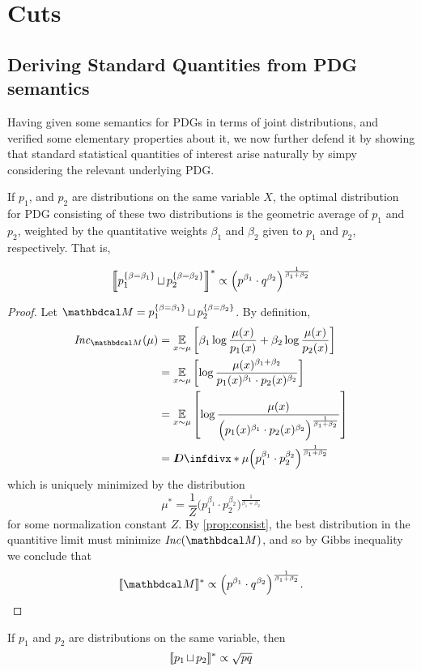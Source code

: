\documentclass[the-pdg-manual.tex]{subfiles}
\begin{document}
\section{Cuts}
\subsection{Deriving Standard Quantities from PDG semantics}
	
	Having given some semantics for PDGs in terms of joint distributions, and verified some elementary properties about it, we now further defend it by showing that standard statistical quantities of interest arise naturally by simpy considering the relevant underlying PDG. 
	
	\begin{prop}
		If $p_1$, and $p_2$ are distributions on the same variable $X$, the optimal distribution for PDG consisting of these two distributions is the geometric average of $p_1$ and $p_2$, weighted by the quantitative weights $\beta_1$ and $\beta_2$ given to $p_1$ and $p_2$, respectively. That is,
		
		\[ \bbr*{p_1 ^{\{\beta = \beta_1 \}} \bundle p_2 ^{\{\beta = \beta_2 \}}}^* \propto \Big(p^{\beta_1} \cdot q^{\beta_2}\Big)^{\frac{1}{\beta_1+\beta_2}} \]
	\end{prop}
	\begin{proof}
		Let $\dg M = p_1 ^{\{\beta = \beta_1 \}} \bundle p_2 ^{\{\beta = \beta_2 \}}$.
		By definition, 
		\begin{align*}
		 	\Inc_{\dg M} (\mu) &= \Ex_{x \sim \mu} \left[ \beta_1 \log \frac{\mu(x)}{p_1(x)} + \beta_2 \log \frac{\mu(x)}{p_2(x)} \right] \\
				&= \Ex_{x \sim \mu} \left[ \log \frac{\mu(x)^{\beta_1 + \beta_2}}{p_1(x)^{\beta_1}\cdot p_2(x)^{\beta_2}} \right] \\
				&= \Ex_{x \sim \mu} \left[ \log \frac{\mu(x)}{\Big( p_1(x)^{\beta_1}\cdot p_2(x)^{\beta_2} \Big)^{\frac{1}{\beta_1+\beta_2}}} \right] \\
				&= \kldiv*{\mu}{\Big( p_1^{\beta_1}\cdot p_2^{\beta_2} \Big)^{\frac{1}{\beta_1+\beta_2}}}
		\end{align*}
		which is uniquely minimized by the distribution
		\[ \mu^* = \frac1Z \Big( p_1^{\beta_1}\cdot p_2^{\beta_2} \Big)^{\frac{1}{\beta_1+\beta_2}} \]
		for some normalization constant $Z$. By \cref{prop:consist}, the best distribution in the quantitive limit must minimize $\Inc(\dg M)$, and so by Gibbs inequality we conclude that
		\[ \bbr{\dg M}^* \propto \Big(p^{\beta_1} \cdot q^{\beta_2}\Big)^{\frac{1}{\beta_1+\beta_2}}. \]
	\end{proof}
	
	\begin{coro}
		If $p_1$ and $p_2$ are distributions on the same variable, then
		\[ \bbr{p_1 \bundle p_2 }^* \propto \sqrt{ p  q } \]
	\end{coro}
	
	
\end{document}
